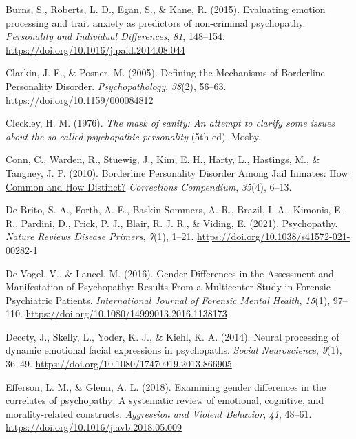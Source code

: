 \documentclass[
  man,floatsintext]{apa7}
\newlength{\cslhangindent}
\newlength{\cslentryspacingunit} %
\newenvironment{CSLReferences}[2] %
 {%
  \setlength{\parindent}{0pt}
  \ifodd #1
  \let\oldpar\par
  \def\par{\hangindent=\cslhangindent\oldpar}
  \fi
  \setlength{\parskip}{#2\cslentryspacingunit}
 }%
 {}
\begin{document}
\begin{CSLReferences}{1}{0}
\leavevmode{}%
Burns, S., Roberts, L. D., Egan, S., \& Kane, R. (2015). Evaluating emotion processing and trait anxiety as predictors of non-criminal psychopathy. \emph{Personality and Individual Differences}, \emph{81}, 148--154. \url{https://doi.org/10.1016/j.paid.2014.08.044}

\leavevmode{}%
Clarkin, J. F., \& Posner, M. (2005). Defining the {Mechanisms} of {Borderline Personality Disorder}. \emph{Psychopathology}, \emph{38}(2), 56--63. \url{https://doi.org/10.1159/000084812}

\leavevmode{}%
Cleckley, H. M. (1976). \emph{The mask of sanity: An attempt to clarify some issues about the so-called psychopathic personality} (5th ed). {Mosby}.

\leavevmode{}%
Conn, C., Warden, R., Stuewig, J., Kim, E. H., Harty, L., Hastings, M., \& Tangney, J. P. (2010). \href{https://www.ncbi.nlm.nih.gov/pmc/articles/PMC4825675}{Borderline {Personality Disorder Among Jail Inmates}: {How Common} and {How Distinct}?} \emph{Corrections Compendium}, \emph{35}(4), 6--13.

\leavevmode{}%
De Brito, S. A., Forth, A. E., Baskin-Sommers, A. R., Brazil, I. A., Kimonis, E. R., Pardini, D., Frick, P. J., Blair, R. J. R., \& Viding, E. (2021). Psychopathy. \emph{Nature Reviews Disease Primers}, \emph{7}(1), 1--21. \url{https://doi.org/10.1038/s41572-021-00282-1}

\leavevmode{}%
De Vogel, V., \& Lancel, M. (2016). Gender {Differences} in the {Assessment} and {Manifestation} of {Psychopathy}: {Results From} a {Multicenter Study} in {Forensic Psychiatric Patients}. \emph{International Journal of Forensic Mental Health}, \emph{15}(1), 97--110. \url{https://doi.org/10.1080/14999013.2016.1138173}

\leavevmode{}%
Decety, J., Skelly, L., Yoder, K. J., \& Kiehl, K. A. (2014). Neural processing of dynamic emotional facial expressions in psychopaths. \emph{Social Neuroscience}, \emph{9}(1), 36--49. \url{https://doi.org/10.1080/17470919.2013.866905}

\leavevmode{}%
Efferson, L. M., \& Glenn, A. L. (2018). Examining gender differences in the correlates of psychopathy: {A} systematic review of emotional, cognitive, and morality-related constructs. \emph{Aggression and Violent Behavior}, \emph{41}, 48--61. \url{https://doi.org/10.1016/j.avb.2018.05.009}


\end{CSLReferences}
\end{document}
